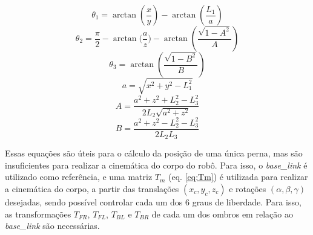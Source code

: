 \documentclass[../main.tex]{subfiles}
\begin{document}
\begin{equation}
  \label{eq:theta1}
  \theta_1 = \arctan{(\frac{x}{y})} - \arctan{(\frac{L_1}{a})}
\end{equation}
\begin{equation}
  \label{eq:theta2}
  \theta_2 = \frac{\pi}{2} - \arctan{(\frac{a}{z}}) - \arctan{(\frac{\sqrt{1-A^2}}{A})}
\end{equation}
\begin{equation}
  \label{eq:theta3}
  \theta_3 = \arctan(\frac{\sqrt{1-B^2}}{B})
\end{equation}
\begin{equation}
  \label{eq:a}
  a = \sqrt{x^2+y^2-L_1^2}
\end{equation}
\begin{equation}
  \label{eq:A}
  A =\frac{a^2+z^2+L_2^2-L_3^2}{2L_2\sqrt{a^2+z^2}}
\end{equation}
\begin{equation}
  \label{eq:B}
  B = \frac{a^2+z^2-L_2^2-L_3^2}{2L_2L_3}
\end{equation}

Essas equações são úteis para o cálculo da posição de uma única perna, mas são insuficientes para realizar a cinemática do corpo do robô. Para isso, o \textit{base\_link} é utilizado como referência, e uma matriz $T_m$ (eq. \ref{eq:Tm}) é utilizada para realizar a cinemática do corpo, a partir das translações $(x_c, y_c, z_c)$ e rotações $(\alpha, \beta, \gamma)$ desejadas, sendo possível controlar cada um dos 6 graus de liberdade. Para isso, as transformações $T_{FR}$, $T_{FL}$, $T_{BL}$ e $T_{BR}$ de cada um dos ombros em relação ao \textit{base\_link} são necessárias.
\end{document}
